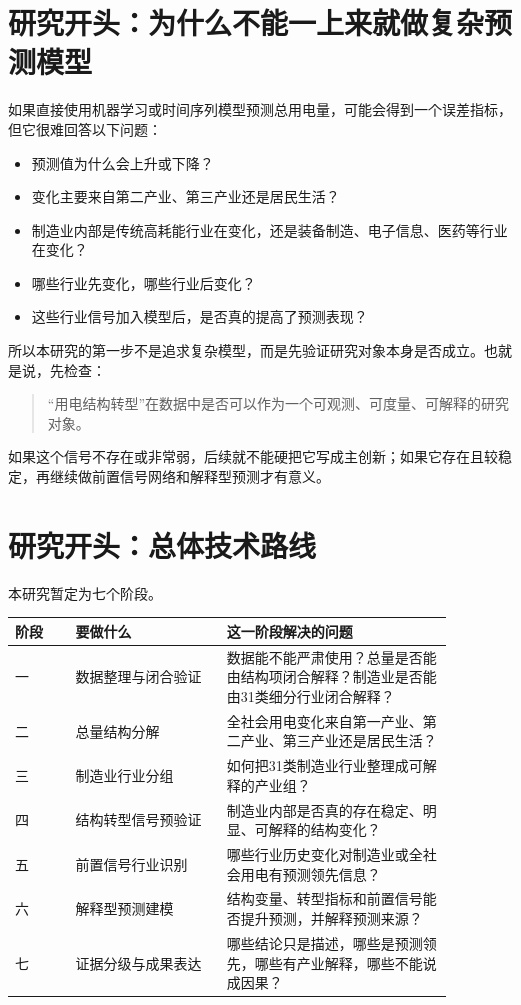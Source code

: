 \documentclass[UTF8,a4paper,11pt]{ctexart}
\begin{document}
\section{研究开头：为什么不能一上来就做复杂预测模型}

如果直接使用机器学习或时间序列模型预测总用电量，可能会得到一个误差指标，但它很难回答以下问题：

\begin{itemize}
  \item 预测值为什么会上升或下降？
  \item 变化主要来自第二产业、第三产业还是居民生活？
  \item 制造业内部是传统高耗能行业在变化，还是装备制造、电子信息、医药等行业在变化？
  \item 哪些行业先变化，哪些行业后变化？
  \item 这些行业信号加入模型后，是否真的提高了预测表现？
\end{itemize}

所以本研究的第一步不是追求复杂模型，而是先验证研究对象本身是否成立。也就是说，先检查：

\begin{quote}
“用电结构转型”在数据中是否可以作为一个可观测、可度量、可解释的研究对象。
\end{quote}

如果这个信号不存在或非常弱，后续就不能硬把它写成主创新；如果它存在且较稳定，再继续做前置信号网络和解释型预测才有意义。

\section{研究开头：总体技术路线}

本研究暂定为七个阶段。

\begin{longtable}{p{0.12\linewidth}p{0.30\linewidth}p{0.45\linewidth}}
\toprule
阶段 & 要做什么 & 这一阶段解决的问题 \\
\midrule
一 & 数据整理与闭合验证 & 数据能不能严肃使用？总量是否能由结构项闭合解释？制造业是否能由31类细分行业闭合解释？\\
二 & 总量结构分解 & 全社会用电变化来自第一产业、第二产业、第三产业还是居民生活？\\
三 & 制造业行业分组 & 如何把31类制造业行业整理成可解释的产业组？\\
四 & 结构转型信号预验证 & 制造业内部是否真的存在稳定、明显、可解释的结构变化？\\
五 & 前置信号行业识别 & 哪些行业历史变化对制造业或全社会用电有预测领先信息？\\
六 & 解释型预测建模 & 结构变量、转型指标和前置信号能否提升预测，并解释预测来源？\\
七 & 证据分级与成果表达 & 哪些结论只是描述，哪些是预测领先，哪些有产业解释，哪些不能说成因果？\\
\bottomrule
\end{longtable}
\end{document}
